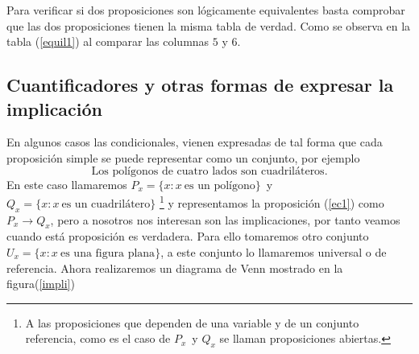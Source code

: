 \nota Para verificar si dos proposiciones son lógicamente equivalentes
basta comprobar que las dos proposiciones tienen la misma tabla de
verdad. Como se observa en la tabla (\ref{equil1}) al comparar las
columnas $5$ y $6$.


\subsection{Cuantificadores y otras formas de expresar la implicación}

En algunos casos las condicionales, vienen expresadas de tal forma
que cada proposición simple se puede representar como un conjunto,
por ejemplo 
\begin{equation}
\mbox{Los polígonos de cuatro lados son cuadriláteros.}\label{ec1}
\end{equation}
 En este caso llamaremos $P_{x}=\{x:x\ \mbox{es un polígono}\}$\ y
$Q_{x}=\{x:x\ \mbox{es un cuadrilátero}\}$ %
\footnote{A las proposiciones que dependen de una variable y de un conjunto
referencia, como es el caso de $P_{x}$\
y $Q_{x}$ se llaman proposiciones abiertas. %
} y representamos la proposición (\ref{ec1}) como $P_{x}\rightarrow Q_{x}$,
pero a nosotros nos interesan son las implicaciones, por tanto veamos
cuando está proposición es verdadera. Para ello tomaremos otro conjunto
$U_{x}=\{x:x\ \mbox{es una figura plana}\}$, a este conjunto lo llamaremos
universal o de referencia. Ahora realizaremos un diagrama de Venn
mostrado en la figura(\ref{impli})

